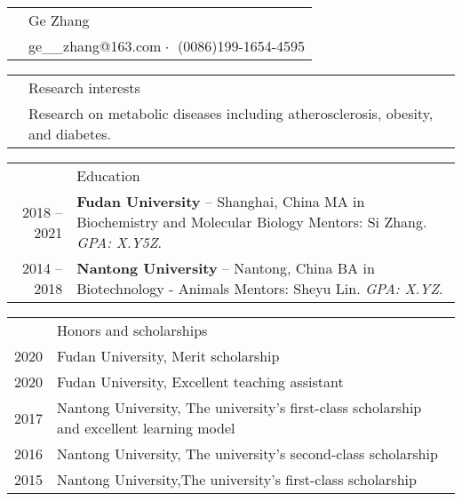 \documentclass[letterpaper, 11pt]{article}
\newcommand{\headingfont}{\Large\color{OliveGreen}}
\newenvironment{SectionTable}[1]{
	\renewcommand*{\arraystretch}{1.7}
	\setlength{\tabcolsep}{10pt}
	\begin{longtable}{Rp{5.2in}} & #1 \\}
{\end{longtable}\vspace{-.3cm}}
\newenvironment{SectionTableSingleSpace}[1]{
	\renewcommand*{\arraystretch}{1.2}
	\setlength{\tabcolsep}{10pt}
	\begin{longtable}{Rp{5.2in}} & #1 \\[0.6em]}
{\end{longtable}\vspace{-.3cm}}
\begin{document}

\begin{SectionTable}{\Huge Ge Zhang} & 
ge\_\_zhang@163.com$\;\boldsymbol{\cdot}\;$ \newline
(0086)199-1654-4595
\end{SectionTable}


\begin{SectionTable}{\headingfont Research interests}
& Research on metabolic diseases including atherosclerosis, obesity, and diabetes.
\end{SectionTable}


\begin{SectionTable}{\headingfont Education}
2018 -- 2021 & 
\textbf{Fudan University} -- Shanghai, China \newline
MA in Biochemistry and Molecular Biology \newline 
Mentors: Si Zhang. \textit{GPA: X.Y5Z}. \\

2014 -- 2018 & 
\textbf{Nantong University} -- Nantong, China \newline
BA in Biotechnology - Animals \newline 
Mentors: Sheyu Lin. \textit{GPA: X.YZ}. \\



\end{SectionTable}


\begin{SectionTableSingleSpace}{\headingfont Honors and scholarships}
2020 & 
Fudan University, Merit scholarship \\

2020 &
Fudan University, Excellent teaching assistant \\

2017 &
Nantong University, The university's first-class scholarship and excellent learning model \\

2016 &
Nantong University, The university's second-class scholarship  \\

2015 &
Nantong University,The university's first-class scholarship 
\end{SectionTableSingleSpace}
\end{document}
